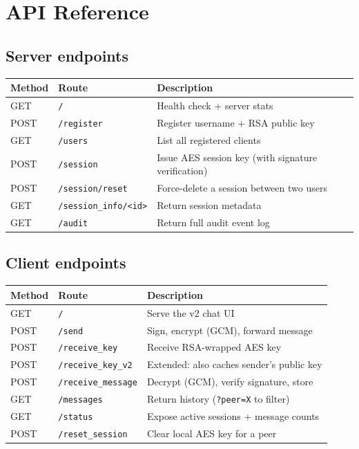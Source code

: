 \documentclass[12pt,a4paper]{article}
\begin{document}
\section{API Reference}

\subsection{Server endpoints}

\begin{center}
\begin{tabular}{llp{8cm}}
\toprule
Method & Route & Description \\
\midrule
GET  & \texttt{/}                         & Health check + server stats \\
POST & \texttt{/register}                 & Register username + RSA public key \\
GET  & \texttt{/users}                    & List all registered clients \\
POST & \texttt{/session}                  & Issue AES session key (with signature verification) \\
POST & \texttt{/session/reset}            & Force-delete a session between two users \\
GET  & \texttt{/session\_info/<id>}       & Return session metadata \\
GET  & \texttt{/audit}                    & Return full audit event log \\
\bottomrule
\end{tabular}
\end{center}

\subsection{Client endpoints}

\begin{center}
\begin{tabular}{llp{7cm}}
\toprule
Method & Route & Description \\
\midrule
GET  & \texttt{/}                  & Serve the v2 chat UI \\
POST & \texttt{/send}              & Sign, encrypt (GCM), forward message \\
POST & \texttt{/receive\_key}      & Receive RSA-wrapped AES key \\
POST & \texttt{/receive\_key\_v2}  & Extended: also caches sender's public key \\
POST & \texttt{/receive\_message}  & Decrypt (GCM), verify signature, store \\
GET  & \texttt{/messages}          & Return history (\texttt{?peer=X} to filter) \\
GET  & \texttt{/status}            & Expose active sessions + message counts \\
POST & \texttt{/reset\_session}    & Clear local AES key for a peer \\
\bottomrule
\end{tabular}
\end{center}
\end{document}
